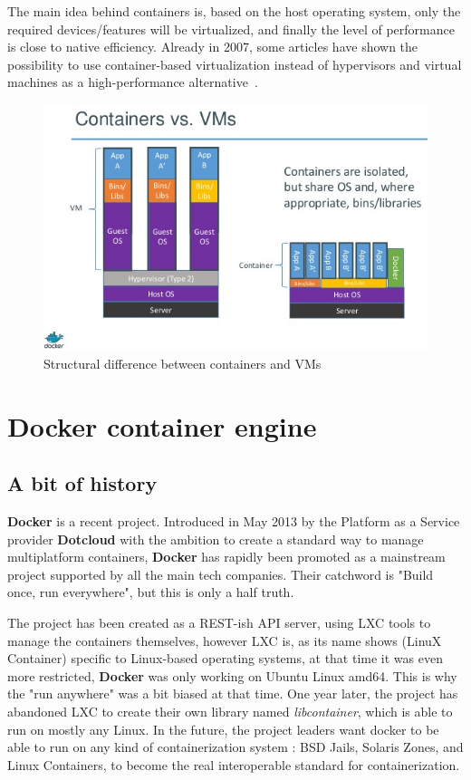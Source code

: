 The main idea behind containers is, based on the host operating system, only
the required devices/features will be virtualized, and finally the level of
performance is close to native efficiency. Already in 2007, some articles have
shown the possibility to use container-based virtualization instead of
hypervisors and virtual machines as a high-performance
alternative~\cite{containersAsAlternative}.

\begin{figure}
	\includegraphics[width=\textwidth]{./Images/containers_vs_vms.png}
	\caption{Structural difference between containers and VMs}
\end{figure}

\section{Docker container engine}

\subsection{A bit of history}

\textbf{Docker} is a recent project. Introduced in May 2013 by the Platform as
a Service provider \textbf{Dotcloud} with the ambition to create a standard way
to manage multiplatform containers, \textbf{Docker} has rapidly been promoted
as a mainstream project supported by all the main tech companies.  Their
catchword is "Build once, run everywhere", but this is only a half truth.

The project has been created as a REST-ish API server, using LXC tools to
manage the containers themselves, however LXC is, as its name shows (LinuX
Container) specific to Linux-based operating systems, at that time it was even
more restricted, \textbf{Docker} was only working on Ubuntu Linux amd64. This
is why the "run anywhere" was a bit biased at that time. One year later, the
project has abandoned LXC to create their own library named
\textit{libcontainer}, which is able to run on mostly any Linux. In the future,
the project leaders want docker to be able to run on any kind of
containerization system : BSD Jails, Solaris Zones, and Linux Containers, to
become the real interoperable standard for containerization.

